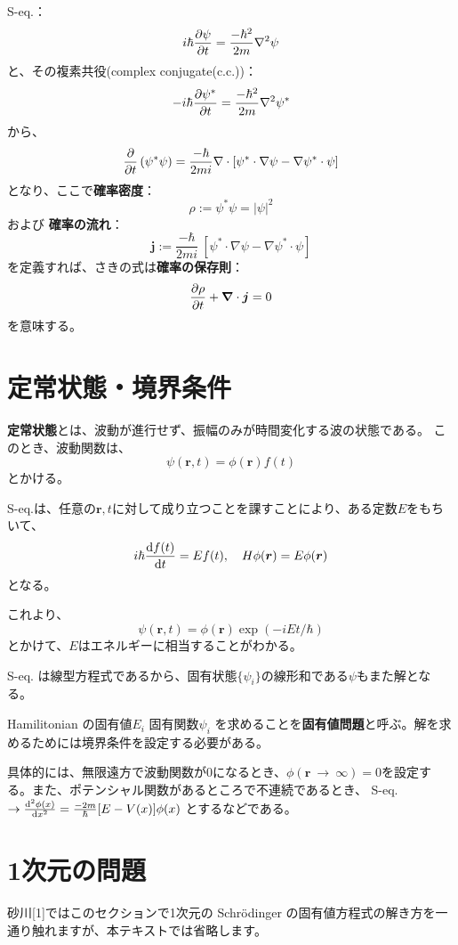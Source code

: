 S-eq.：
\[
	i\hbar \frac{\partial \psi}{\partial t} = \frac{-\hbar^2}{2m} \nabla^2 \psi
\]
と、その複素共役(complex conjugate(c.c.))：
\[
	-i\hbar \frac{\partial \psi^\ast}{\partial t} = \frac{-\hbar^2}{2m} \nabla^2 \psi^\ast
\]
から、
\[
	\frac{\partial }{\partial t} \left( \psi^\ast \psi \right)
	= \frac{-\hbar}{2mi} \nabla \cdot \left[ \psi^\ast \cdot \nabla\psi - \nabla\psi^\ast \cdot \psi \right]
\]
となり、ここで\textbf{確率密度}：
\[
	\rho :=  \psi^\ast \psi = | \psi |^2
\]
および \textbf{確率の流れ}：
\[\bm{j} := \frac{-\hbar}{2mi}\ \left[ \psi^\ast \cdot \nabla\psi - \nabla\psi^\ast \cdot \psi \right]\]
を定義すれば、さきの式は\textbf{確率の保存則}：
\[\frac{\partial \rho}{\partial t} + \bm{\nabla} \cdot \bm{j} = 0\]
を意味する。

\section{定常状態・境界条件}
\textbf{定常状態}とは、波動が進行せず、振幅のみが時間変化する波の状態である。
このとき、波動関数は、
\[ \psi(\bm{r}, t) = \phi(\bm{r}) f(t) \]
とかける。

S-eq.は、任意の$\bm{r}, t$に対して成り立つことを課すことにより、ある定数$E$をもちいて、
\[
	i\hbar \derivative{f(t)}{t} = Ef(t),\ \ \ H\phi(\bm{r}) = E\phi(\bm{r})
\]
となる。

これより、
\[
	\psi(\bm{r}, t) = \phi(\bm{r}) \exp (-iEt/\hbar)
\]
とかけて、$E$はエネルギーに相当することがわかる。

S-eq. は線型方程式であるから、固有状態$\{ \psi_i \}$の線形和である$\psi$もまた解となる。

Hamilitonian の固有値$E_i$ 固有関数$\psi_i$ を求めることを\textbf{固有値問題}と呼ぶ。解を求めるためには境界条件を設定する必要がある。

具体的には、無限遠方で波動関数が0になるとき、$\phi(\bm{r}\ \rightarrow\ \infty) = 0 $を設定する。また、ポテンシャル関数があるところで不連続であるとき、
	S-eq. $\rightarrow
	\frac{\mathrm{d}^2 \phi(x)}{\mathrm{d} {x}^2} = \frac{-2m}{\hbar} [E-V(x)] \phi(x)
	$
とするなどである。
\\

\section{1次元の問題}
砂川[1]ではこのセクションで1次元の Schr\"odinger の固有値方程式の解き方を一通り触れますが、本テキストでは省略します。
